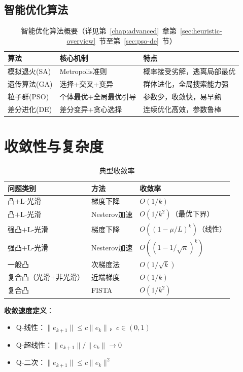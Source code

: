 \subsection{智能优化算法}

\begin{table}[H]
\centering
\caption{智能优化算法概要（详见第~\ref{chap:advanced}~章第~\ref{sec:heuristic-overview}~节至第~\ref{sec:pso-de}~节）}\label{tab:metaheuristic}
\begin{tabular}{llp{6cm}}
\toprule
\textbf{算法} & \textbf{核心机制} & \textbf{特点} \\
\midrule
模拟退火(SA) & Metropolis准则 & 概率接受劣解，逃离局部最优 \\
遗传算法(GA) & 选择+交叉+变异 & 群体进化，全局搜索能力强 \\
粒子群(PSO) & 个体最优+全局最优引导 & 参数少，收敛快，易早熟 \\
差分进化(DE) & 差分变异+贪心选择 & 连续优化高效，参数鲁棒 \\
\bottomrule
\end{tabular}
\end{table}

\section{收敛性与复杂度}

\begin{table}[H]
\centering
\small
\caption{典型收敛率}\label{tab:convergence}
\begin{tabular}{@{}>{\raggedright\arraybackslash}p{3.5cm}>{\raggedright\arraybackslash}p{3cm}>{\raggedright\arraybackslash}p{4.5cm}@{}}
\toprule
\textbf{问题类别} & \textbf{方法} & \textbf{收敛率} \\
\midrule
凸$+$L-光滑 & 梯度下降 & $O(1/k)$ \\
凸$+$L-光滑 & Nesterov加速 & $O(1/k^2)$（最优下界） \\
强凸$+$L-光滑 & 梯度下降 & $O((1-\mu/L)^k)$（线性） \\
强凸$+$L-光滑 & Nesterov加速 & $O((1-1/\sqrt{\kappa})^k)$ \\
一般凸 & 次梯度法 & $O(1/\sqrt{k})$ \\
复合凸（光滑$+$非光滑） & 近端梯度 & $O(1/k)$ \\
复合凸 & FISTA & $O(1/k^2)$ \\
\bottomrule
\end{tabular}
\end{table}

\textbf{收敛速度定义}：
\begin{itemize}
    \item Q-线性：$\|e_{k+1}\| \leq c \|e_k\|$，$c \in (0,1)$
    \item Q-超线性：$\|e_{k+1}\|/\|e_k\| \to 0$
    \item Q-二次：$\|e_{k+1}\| \leq c \|e_k\|^2$
\end{itemize}

